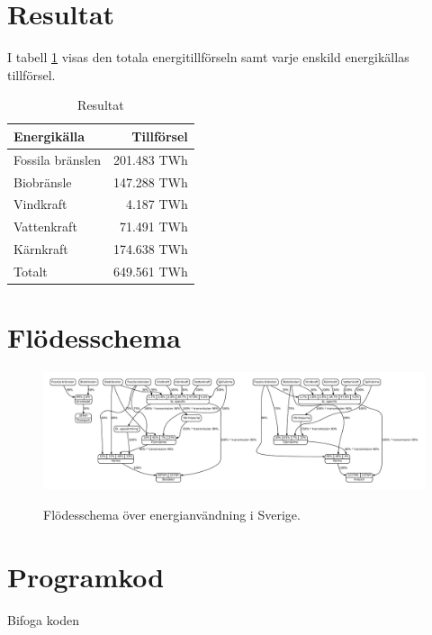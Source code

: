 \documentclass[a4paper,11pt,fleqn, titlepage]{article}
\begin{document}
\section{Resultat}

I tabell \ref{resultat} visas den totala energitillförseln samt varje
enskild energikällas tillförsel.
\begin{table}[h!]
	\centering
	\begin{tabular}{| l | r |}
		\hline
		Energikälla      & Tillförsel \\ \hline
		Fossila bränslen & 201.483 TWh \\
		Biobränsle       & 147.288 TWh \\
		Vindkraft        &   4.187 TWh \\
		Vattenkraft      &  71.491 TWh \\
		Kärnkraft        & 174.638 TWh \\ \hline
		Totalt           & 649.561 TWh \\ \hline
	\end{tabular}
	\caption{Resultat}
	\label{resultat}
\end{table}


\newpage
\appendix

\section{Flödesschema}
\begin{figure}[h!]
	\centering 
	\vspace*{0cm}
	\includegraphics[width=0.6\paperheight,angle=270]{diagram.pdf}
	\label{app:schema}
	\caption{Flödesschema över energianvändning i Sverige.}
\end{figure}

\newpage

\section{Programkod}
Bifoga koden
\end{document}
